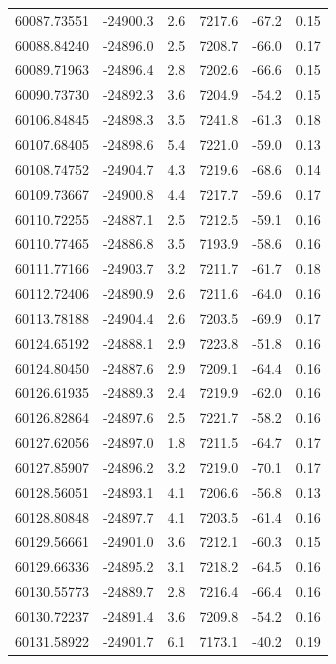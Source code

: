 \documentclass[fleqn,usenatbib,useAMS]{mnras}
\begin{document}
\begin{table}
 \vspace{-1em}
\begin{tabular}[t]{cccccc}
60087.73551 & -24900.3 & 2.6 & 7217.6 & -67.2 & 0.15\\ 
60088.84240 & -24896.0 & 2.5 & 7208.7 & -66.0 & 0.17\\ 
60089.71963 & -24896.4 & 2.8 & 7202.6 & -66.6 & 0.15\\ 
60090.73730 & -24892.3 & 3.6 & 7204.9 & -54.2 & 0.15\\ 
60106.84845 & -24898.3 & 3.5 & 7241.8 & -61.3 & 0.18\\ 
60107.68405 & -24898.6 & 5.4 & 7221.0 & -59.0 & 0.13\\ 
60108.74752 & -24904.7 & 4.3 & 7219.6 & -68.6 & 0.14\\ 
60109.73667 & -24900.8 & 4.4 & 7217.7 & -59.6 & 0.17\\ 
60110.72255 & -24887.1 & 2.5 & 7212.5 & -59.1 & 0.16\\ 
60110.77465 & -24886.8 & 3.5 & 7193.9 & -58.6 & 0.16\\ 
60111.77166 & -24903.7 & 3.2 & 7211.7 & -61.7 & 0.18\\ 
60112.72406 & -24890.9 & 2.6 & 7211.6 & -64.0 & 0.16\\
60113.78188 & -24904.4 & 2.6 & 7203.5 & -69.9 & 0.17\\ 
60124.65192 & -24888.1 & 2.9 & 7223.8 & -51.8 & 0.16\\ 
60124.80450 & -24887.6 & 2.9 & 7209.1 & -64.4 & 0.16\\ 
60126.61935 & -24889.3 & 2.4 & 7219.9 & -62.0 & 0.16\\ 
60126.82864 & -24897.6 & 2.5 & 7221.7 & -58.2 & 0.16\\ 
60127.62056 & -24897.0 & 1.8 & 7211.5 & -64.7 & 0.17\\ 
60127.85907 & -24896.2 & 3.2 & 7219.0 & -70.1 & 0.17\\ 
60128.56051 & -24893.1 & 4.1 & 7206.6 & -56.8 & 0.13\\
60128.80848 & -24897.7 & 4.1 & 7203.5 & -61.4 & 0.16\\ 
60129.56661 & -24901.0 & 3.6 & 7212.1 & -60.3 & 0.15\\ 
60129.66336 & -24895.2 & 3.1 & 7218.2 & -64.5 & 0.16\\ 
60130.55773 & -24889.7 & 2.8 & 7216.4 & -66.4 & 0.16\\ 
60130.72237 & -24891.4 & 3.6 & 7209.8 & -54.2 & 0.16\\ 
60131.58922 & -24901.7 & 6.1 & 7173.1 & -40.2 & 0.19\\ 

\end{tabular}
\end{table}
\end{document}
